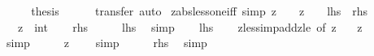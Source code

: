 \begin{isabellebody}
\ \ \isamarkupfalse%
\ \isamarkupfalse%
\ {\isacharquery}{\kern0pt}thesis\isanewline
\ \ \ \ \isamarkupfalse%
\ transfer\ auto\isanewline
{}\isamarkupfalse%
%
\endisatagproof
{\isafoldproof}%
%
\isadelimproof
\isanewline
%
\endisadelimproof
\isanewline
{}\isamarkupfalse%
\ zabs{\isacharunderscore}{\kern0pt}less{\isacharunderscore}{\kern0pt}one{\isacharunderscore}{\kern0pt}iff\ {\isacharbrackleft}{\kern0pt}simp{\isacharbrackright}{\kern0pt}{\isacharcolon}{\kern0pt}\ {\isachardoublequoteopen}{\isasymbar}z{\isasymbar}\ {\isacharless}{\kern0pt}\ {}\ {\isasymlongleftrightarrow}\ z\ {\isacharequal}{\kern0pt}\ {}{\isachardoublequoteclose}\ {\isacharparenleft}{\kern0pt}\ {\isachardoublequoteopen}{\isacharquery}{\kern0pt}lhs\ {\isasymlongleftrightarrow}\ {\isacharquery}{\kern0pt}rhs{\isachardoublequoteclose}{\isacharparenright}{\kern0pt}\isanewline
\ \ \ z\ {\isacharcolon}{\kern0pt}{\isacharcolon}{\kern0pt}\ int\isanewline
%
\isadelimproof
%
\endisadelimproof
%
\isatagproof
{}\isamarkupfalse%
\isanewline
\ \ \isamarkupfalse%
\ {\isacharquery}{\kern0pt}rhs\isanewline
\ \ \isamarkupfalse%
\ \isamarkupfalse%
\ {\isacharquery}{\kern0pt}lhs\ \isamarkupfalse%
\ simp\isanewline
{}\isamarkupfalse%
\isanewline
\ \ \isamarkupfalse%
\ {\isacharquery}{\kern0pt}lhs\isanewline
\ \ \isamarkupfalse%
\ zless{\isacharunderscore}{\kern0pt}imp{\isacharunderscore}{\kern0pt}add{}{\isacharunderscore}{\kern0pt}zle\ {\isacharbrackleft}{\kern0pt}of\ {\isachardoublequoteopen}{\isasymbar}z{\isasymbar}{\isachardoublequoteclose}\ {}{\isacharbrackright}{\kern0pt}\ \isamarkupfalse%
\ {\isachardoublequoteopen}{\isasymbar}z{\isasymbar}\ {\isacharplus}{\kern0pt}\ {}\ {\isasymle}\ {}{\isachardoublequoteclose}\ \isamarkupfalse%
\ simp\isanewline
\ \ \isamarkupfalse%
\ \isamarkupfalse%
\ {\isachardoublequoteopen}{\isasymbar}z{\isasymbar}\ {\isasymle}\ {}{\isachardoublequoteclose}\ \isamarkupfalse%
\ simp\isanewline
\ \ \isamarkupfalse%
\ \isamarkupfalse%
\ {\isacharquery}{\kern0pt}rhs\ \isamarkupfalse%
\ simp\isanewline
{}\isamarkupfalse%
%
\endisatagproof
{\isafoldproof}%
%
\isadelimproof
%
\endisadelimproof
%
\isadelimdocument
%
\endisadelimdocument

\end{isabellebody}
